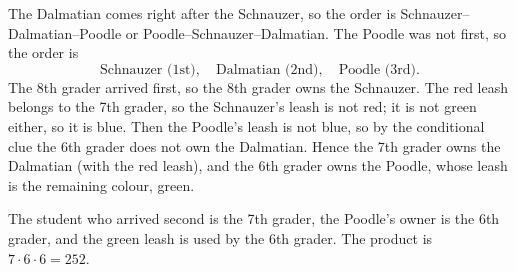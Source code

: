 The Dalmatian comes right after the Schnauzer, so the order is Schnauzer--Dalmatian--Poodle or Poodle--Schnauzer--Dalmatian. The Poodle was not first, so the order is
\[
\text{Schnauzer (1st)},\quad \text{Dalmatian (2nd)},\quad \text{Poodle (3rd)}.
\]
The 8th grader arrived first, so the 8th grader owns the Schnauzer. The red leash belongs to the 7th grader, so the Schnauzer's leash is not red; it is not green either, so it is blue. Then the Poodle's leash is not blue, so by the conditional clue the 6th grader does not own the Dalmatian. Hence the 7th grader owns the Dalmatian (with the red leash), and the 6th grader owns the Poodle, whose leash is the remaining colour, green.

The student who arrived second is the 7th grader, the Poodle's owner is the 6th grader, and the green leash is used by the 6th grader. The product is $7\cdot6\cdot6=\boxed{252}$.
